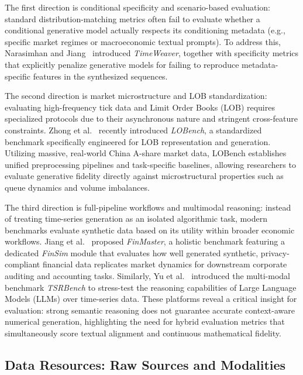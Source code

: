 \documentclass[11pt,a4paper]{article}
\begin{document}
The first direction is conditional specificity and scenario-based evaluation: standard distribution-matching metrics often fail to evaluate whether a conditional generative model actually respects its conditioning metadata (e.g., specific market regimes or macroeconomic textual prompts). To address this, Narasimhan and Jiang~\citep{narasimhan2024timeweaver} introduced \textit{TimeWeaver}, together with specificity metrics that explicitly penalize generative models for failing to reproduce metadata-specific features in the synthesized sequences.

The second direction is market microstructure and LOB standardization: evaluating high-frequency tick data and Limit Order Books (LOB) requires specialized protocols due to their asynchronous nature and stringent cross-feature constraints. Zhong et al.~\citep{lobench2025} recently introduced \textit{LOBench}, a standardized benchmark specifically engineered for LOB representation and generation. Utilizing massive, real-world China A-share market data, LOBench establishes unified preprocessing pipelines and task-specific baselines, allowing researchers to evaluate generative fidelity directly against microstructural properties such as queue dynamics and volume imbalances.

The third direction is full-pipeline workflows and multimodal reasoning: instead of treating time-series generation as an isolated algorithmic task, modern benchmarks evaluate synthetic data based on its utility within broader economic workflows. Jiang et al.~\citep{finmaster2025} proposed \textit{FinMaster}, a holistic benchmark featuring a dedicated \textit{FinSim} module that evaluates how well generated synthetic, privacy-compliant financial data replicates market dynamics for downstream corporate auditing and accounting tasks. Similarly, Yu et al.~\citep{tsrbench2026} introduced the multi-modal benchmark \textit{TSRBench} to stress-test the reasoning capabilities of Large Language Models (LLMs) over time-series data. These platforms reveal a critical insight for evaluation: strong semantic reasoning does not guarantee accurate context-aware numerical generation, highlighting the need for hybrid evaluation metrics that simultaneously score textual alignment and continuous mathematical fidelity.


\subsection{Data Resources: Raw Sources and Modalities}
\label{sec:data_resources}
\end{document}
